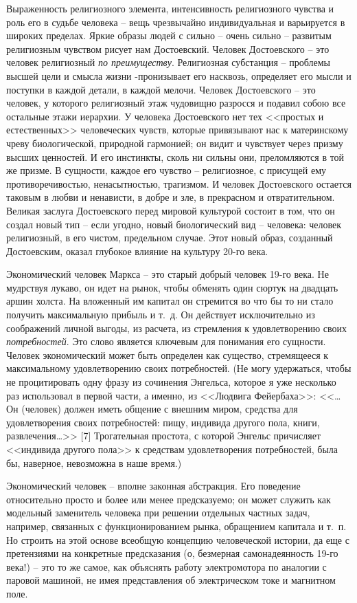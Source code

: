 \documentclass{book}
\begin{document}
Выраженность религиозного элемента, интенсивность рели­гиозного чувства и роль его в судьбе человека -- вещь чрезвы­чайно индивидуальная и варьируется в широких пределах. Яр­кие образы людей с сильно -- очень сильно -- развитым религи­озным чувством рисует нам Достоевский. Человек Достоев­ского -- это человек религиозный \textit{по преимуществу}.  Религиоз­ная субстанция -- проблемы высшей цели и смысла жизни -пронизывает его насквозь, определяет его мысли и поступки в каждой детали, в каждой мелочи. Человек Достоевского -- это человек, у которого религиозный этаж чудовищно разрос­ся и подавил собою все остальные этажи иерархии. У человека Достоевского нет тех <<простых и естественных>> человеческих чувств, которые привязывают нас к материнскому чреву био­логической, природной гармонией; он видит и чувствует через призму высших ценностей. И его инстинкты, сколь ни сильны они, преломляются в той же призме. В сущности, каждое его чувство -- религиозное, с присущей ему противоречивостью, ненасытностью, трагизмом. И 
человек 
Достоевского остается таковым в любви и ненависти, в добре и зле, в прекрасном и отвратительном. Великая заслуга Достоевского перед мировой культурой состоит в том, что он создал новый тип -- если угодно, новый биологический вид -- человека: человек религиозный, в его чистом, предельном случае. Этот новый образ, созданный Достоевским, оказал глубокое влияние на культуру 20-го века.

Экономический человек Маркса -- это старый добрый чело­век 19-го века. Не мудрствуя лукаво, он идет на рынок, чтобы обменять один сюртук на двадцать аршин холста. На вложен­ный им капитал он стремится во что бы то ни стало получить максимальную прибыль и т.~д. Он действует исключительно из соображений личной выгоды, из расчета, из стремления к удов­летворению своих \textit{потребностей}.  Это слово является ключевым для понимания его сущности. Человек экономический может быть определен как существо, стремящееся к максимальному удовлетворению своих потребностей. (Не могу удержаться, что­бы не процитировать одну фразу из сочинения Энгельса, кото­рое я уже несколько раз использовал в первой части, а именно, из <<Людвига Фейербаха>>: <<\ldots{}Он (человек) должен иметь обще­ние с внешним миром, средства для удовлетворения своих по­требностей: пищу, индивида другого пола, книги, развлече­ния\ldots>> [7] Трогательная простота, с которой Энгельс причисляет <<индивида другого пола>> к средствам удовлетворения потреб­ностей, 
была бы, наверное, невозможна в наше время.)

Экономический человек -- вполне законная абстракция. Его поведение относительно просто и более или менее пред­сказуемо; он может служить как модельный заменитель чело­века при решении отдельных частных задач, например, связанных с функционированием рынка, обращением капитала и т.~п. Но строить на этой основе всеобщую концепцию человеческой истории, да еще с претензиями на конкретные предсказания (о, безмерная самонадеянность 19-го века!) -- это то же самое, как объяснять работу электромотора по аналогии с паровой машиной, не имея представления об электрическом токе и маг­нитном поле.
\end{document}
